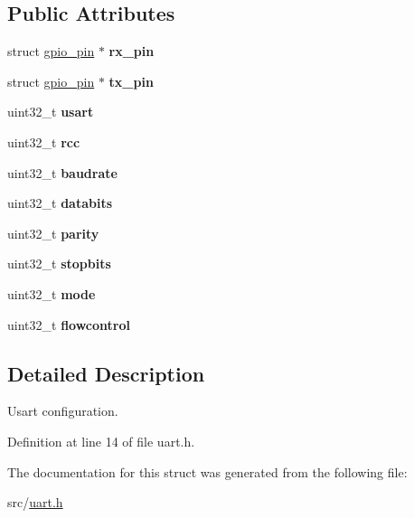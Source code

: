 \subsection*{Public Attributes}
\begin{DoxyCompactItemize}
\item 
\hypertarget{structusart__config_afb0c0a9281bba234d1b7282fd5661826}{}struct \hyperlink{structgpio__pin}{gpio\+\_\+pin} $\ast$ {\bfseries rx\+\_\+pin}\label{structusart__config_afb0c0a9281bba234d1b7282fd5661826}

\item 
\hypertarget{structusart__config_acda049cae41a8261b02b52ef76830941}{}struct \hyperlink{structgpio__pin}{gpio\+\_\+pin} $\ast$ {\bfseries tx\+\_\+pin}\label{structusart__config_acda049cae41a8261b02b52ef76830941}

\item 
\hypertarget{structusart__config_a7057d1e4e59d4cb6f002cace870fa34b}{}uint32\+\_\+t {\bfseries usart}\label{structusart__config_a7057d1e4e59d4cb6f002cace870fa34b}

\item 
\hypertarget{structusart__config_a5362ef6b4daf5a9e2722c9c4e167e9ed}{}uint32\+\_\+t {\bfseries rcc}\label{structusart__config_a5362ef6b4daf5a9e2722c9c4e167e9ed}

\item 
\hypertarget{structusart__config_acacbd7ecb3d46f576ff1361ae40019fd}{}uint32\+\_\+t {\bfseries baudrate}\label{structusart__config_acacbd7ecb3d46f576ff1361ae40019fd}

\item 
\hypertarget{structusart__config_a688b390f173cc710c95227d84a8f0771}{}uint32\+\_\+t {\bfseries databits}\label{structusart__config_a688b390f173cc710c95227d84a8f0771}

\item 
\hypertarget{structusart__config_a69189444320b793047313d2e80c9df6b}{}uint32\+\_\+t {\bfseries parity}\label{structusart__config_a69189444320b793047313d2e80c9df6b}

\item 
\hypertarget{structusart__config_a5d944fbbe5a88c9a2f2d60df6a092f69}{}uint32\+\_\+t {\bfseries stopbits}\label{structusart__config_a5d944fbbe5a88c9a2f2d60df6a092f69}

\item 
\hypertarget{structusart__config_afaf14d61e3be8a4d3208a1acb68967d4}{}uint32\+\_\+t {\bfseries mode}\label{structusart__config_afaf14d61e3be8a4d3208a1acb68967d4}

\item 
\hypertarget{structusart__config_aef2d53d38b3b8b974a5e3355061f9ec8}{}uint32\+\_\+t {\bfseries flowcontrol}\label{structusart__config_aef2d53d38b3b8b974a5e3355061f9ec8}

\end{DoxyCompactItemize}


\subsection{Detailed Description}
Usart configuration. 

Definition at line 14 of file uart.\+h.



The documentation for this struct was generated from the following file\+:\begin{DoxyCompactItemize}
\item 
src/\hyperlink{uart_8h}{uart.\+h}\end{DoxyCompactItemize}
